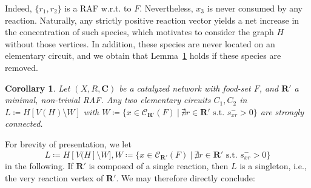 \documentclass[pdflatex]{sn-jnl}
\theoremstyle{thmstyleone}%
\newtheorem{corollary}[theorem]{Corollary}%
\theoremstyle{examplesty}%
\theoremstyle{thmstylethree}%
\newcommand{\closure}[2]{\mathscr{C}_{#1}(#2)}
\newcommand{\RAF}[0]{\mathbf{R}'}
\newcommand{\cat}{\mathbf{C}}
\begin{document}
Indeed, $\{r_1,r_2\}$ is a RAF w.r.t. to $F$. Nevertheless, $x_3$ is never consumed by any reaction. Naturally, any strictly positive reaction 
vector yields a net increase in the concentration of such species, which motivates to consider the graph $H$ without those vertices. In addition, 
these species are never located on an elementary circuit, and we obtain that Lemma~\ref{lem:strElCirc} holds if these species are removed.
\vspace{6pt}
\begin{corollary}\label{lem:strElCirc}
	Let $(X,R, \cat)$ be a catalyzed network with food-set $F$, and $\RAF$ a minimal, non-trivial RAF. Any two elementary circuits $C_1,C_2$ 
	in $L\coloneqq H[V(H)\setminus W]$ with $W\coloneqq \{x\in \closure{\RAF}{F} \ | \ \nexists r \in \RAF \text{ s.t. } s^-_{xr}>0\}$ are strongly connected. 
\end{corollary}
\vspace{6pt}
For brevity of presentation, we let 
\begin{equation}\label{eq:graphL}
	L\coloneqq H[V(H]\setminus W], W\coloneqq \{x\in \closure{\RAF}{F} \ | \ \nexists r \in \RAF \text{ s.t. } s^-_{xr}>0\} 
\end{equation}
in the following. If $\RAF$ is composed of a single reaction, then $L$ is a singleton, i.e., the very reaction vertex of $\RAF$. 
We may therefore directly conclude:
\end{document}
